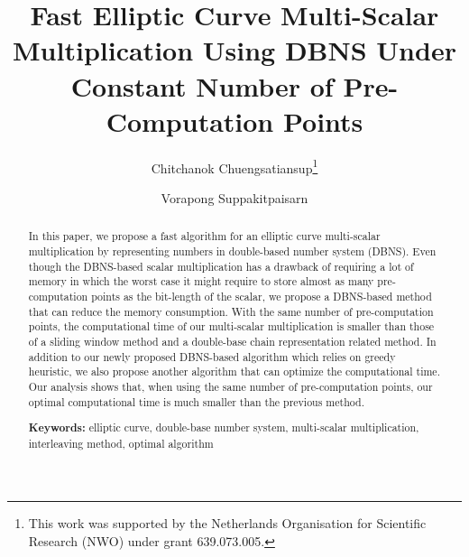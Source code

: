\documentclass[a4paper,11pt,runningheads]{llncs}
\begin{document}
\title{Fast Elliptic Curve Multi-Scalar Multiplication Using DBNS Under Constant Number of Pre-Computation Points}

\author{
Chitchanok Chuengsatiansup\thanks{This work was supported by the Netherlands Organisation for Scientific Research (NWO) under grant 639.073.005.}
\and
Vorapong Suppakitpaisarn
}


\maketitle

\begin{abstract}
In this paper, we propose a fast algorithm for an elliptic curve multi-scalar multiplication by representing numbers in double-based number system (DBNS).
Even though the DBNS-based scalar multiplication has a drawback of requiring a lot of memory
in which the worst case it might require to store almost as many pre-computation points as the bit-length of the scalar,
we propose a DBNS-based method that can reduce the memory consumption.
With the same number of pre-computation points, the computational time of our multi-scalar multiplication is smaller than
those of a sliding window method and a double-base chain representation related method.
In addition to our newly proposed DBNS-based algorithm which relies on greedy heuristic,
we also propose another algorithm that can optimize the computational time.
Our analysis shows that, when using the same number of pre-computation points, our optimal computational time is much smaller than the previous method. 

\smallskip
\textbf{Keywords:} 
elliptic curve, double-base number system, multi-scalar multiplication, interleaving method, optimal algorithm
\end{abstract}






\clearpage


\end{document}
